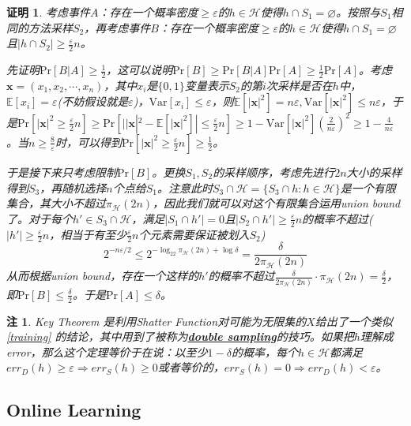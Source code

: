 \documentclass[8pt]{article}
\theoremstyle{compact}
\newtheorem{remark}{注}
\newtheorem{Proof}{证明}
\def\obj#1{\textbf{\uline{#1}}}
\def\le{\leqslant}
\def\ge{\geqslant}
\def\Pr#1{\text{Pr}\left[{#1}\right]}
\def\E#1{\mathbb{E}\left[{#1}\right]}
\def\Var#1{\text{Var}\left[{#1}\right]}
\begin{document}
\begin{Proof}
	考虑事件$A$：存在一个概率密度$\ge \varepsilon$的$h \in \mathcal H$使得$h \cap S_1 = \varnothing$。按照与$S_1$相同的方法采样$S_2$，再考虑事件$B$：存在一个概率密度$\ge \varepsilon$的$h \in \mathcal H$使得$h \cap S_1 = \varnothing$且$|h \cap S_2| \ge \frac{\varepsilon}{2}n$。
	
	先证明$\Pr{B|A} \ge \frac12$，这可以说明$\Pr{B} \ge \Pr{B|A}\Pr{A} \ge \frac12\Pr{A}$。考虑$\mathbf x = (x_1, x_2, \cdots, x_n)$，其中$x_i$是$\{0, 1\}$变量表示$S_2$的第$i$次采样是否在$h$中，$\E{x_i} = \varepsilon$(不妨假设就是$\varepsilon$)，$ \Var{x_i} \le \varepsilon$，则$\E{|\mathbf x|^2} = n\varepsilon, \Var{|\mathbf x|^2} \le n\varepsilon$，于是$\Pr{|\mathbf x|^2 \ge \frac{\varepsilon}{2}n} \ge \Pr{||\mathbf x|^2 - \E{|\mathbf x|^2}| \le \frac{\varepsilon}{2}n} \ge 1 - \Var{|\mathbf x|^2}\left(\frac{2}{n\varepsilon}\right)^2 \ge 1 - \frac{4}{n\varepsilon}$。当$n \ge \frac{8}{\varepsilon}$时，可以得到$\Pr{|\mathbf x|^2 \ge \frac{\varepsilon}{2}n} \ge \frac12$。
	
	于是接下来只考虑限制$\Pr{B}$。更换$S_1, S_2$的采样顺序，考虑先进行$2n$大小的采样得到$S_3$，再随机选择$n$个点给$S_1$。注意此时$S_3 \cap \mathcal H= \{S_3 \cap h: h \in \mathcal H\}$是一个有限集合，其大小不超过$\pi_{\mathcal H}(2n)$，因此我们就可以对这个有限集合运用union bound了。对于每个$h' \in S_3 \cap \mathcal H$，满足$|S_1 \cap h'| = 0$且$|S_2 \cap h'| \ge \frac{\varepsilon}{2}n$的概率不超过($|h'| \ge \frac{\varepsilon}{2}n$，相当于有至少$\frac{\varepsilon}{2}n$个元素需要保证被划入$S_2$)\begin{equation}
		2^{-n\varepsilon / 2} \le 2^{-\log_22\pi_{\mathcal H}(2n) + \log \delta} = \frac{\delta}{2\pi_{\mathcal H}(2n)}
	\end{equation}
	从而根据union bound，存在一个这样的$h'$的概率不超过$\frac{\delta}{2\pi_{\mathcal H}(2n)} \cdot \pi_{\mathcal H}(2n) = \frac{\delta}{2}$，即$\Pr{B} \le \frac{\delta}{2}$。于是$\Pr{A} \le \delta$。
\end{Proof}
\begin{remark}
	Key Theorem 是利用Shatter Function对可能为无限集的$X$给出了一个类似\cref{training} 的结论，其中用到了被称为\obj{double sampling}的技巧。如果把$h$理解成error，那么这个定理等价于在说：以至少$1 - \delta$的概率，每个$h \in \mathcal H$都满足$err_D(h) \ge \varepsilon \Rightarrow err_S(h) \ge 0$或者等价的，$err_S(h) = 0 \Rightarrow err_D(h) < \varepsilon$。
\end{remark}
\subsection{Online Learning}
\end{document}
